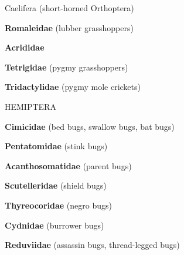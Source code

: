 \documentclass[letterpaper,10pt]{article}
\begin{document}
{\makebox[0.20cm]{}  Caelifera (short-horned Orthoptera) \par
\makebox[0.6cm]{}  \textbf{Romaleidae} (lubber grasshoppers) \par
\makebox[0.6cm]{}  \textbf{Acrididae} \par
\makebox[0.6cm]{}  \textbf{Tetrigidae} (pygmy grasshoppers) \par
\makebox[0.6cm]{}  \textbf{Tridactylidae} (pygmy mole crickets) \par
%
%
%
\makebox[0.0cm]{}  HEMIPTERA \par
\makebox[0.6cm]{}  \textbf{Cimicidae} (bed bugs, swallow bugs, bat bugs) \par
\makebox[0.6cm]{}  \textbf{Pentatomidae} (stink bugs) \par
\makebox[0.6cm]{}  \textbf{Acanthosomatidae} (parent bugs) \par
\makebox[0.6cm]{}  \textbf{Scutelleridae} (shield bugs) \par
\makebox[0.6cm]{}  \textbf{Thyreocoridae} (negro bugs) \par
\makebox[0.6cm]{}  \textbf{Cydnidae} (burrower bugs) \par
\makebox[0.6cm]{}  \textbf{Reduviidae} (assassin bugs, thread-legged bugs) \par
}
\end{document}
